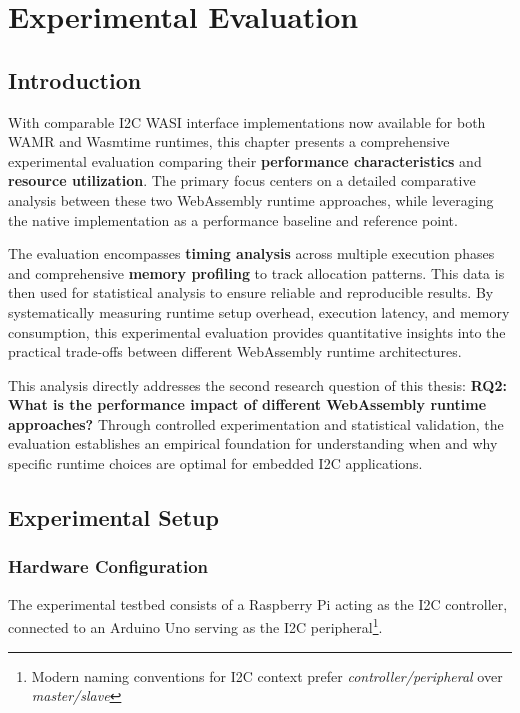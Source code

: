 \chapter{Experimental Evaluation}
\label{chap:experimental-evaluation}

\section{Introduction}
\label{sec:eval-intro}


With comparable I2C WASI interface implementations now available for both WAMR and Wasmtime runtimes, this chapter presents a comprehensive experimental evaluation comparing their \textbf{performance characteristics} and \textbf{resource utilization}. The primary focus centers on a detailed comparative analysis between these two WebAssembly runtime approaches, while leveraging the native implementation as a performance baseline and reference point.

The evaluation encompasses \textbf{timing analysis} across multiple execution phases and comprehensive \textbf{memory profiling} to track allocation patterns. This data is then used for statistical analysis to ensure reliable and reproducible results. By systematically measuring runtime setup overhead, execution latency, and memory consumption, this experimental evaluation provides quantitative insights into the practical trade-offs between different WebAssembly runtime architectures.

This analysis directly addresses the second research question of this thesis: \textbf{RQ2: What is the performance impact of different WebAssembly runtime approaches?} Through controlled experimentation and statistical validation, the evaluation establishes an empirical foundation for understanding when and why specific runtime choices are optimal for embedded I2C applications.

\section{Experimental Setup}
\label{sec:experimental-setup}

\subsection{Hardware Configuration}
\label{subsec:hardware-config}

The experimental testbed consists of a Raspberry Pi acting as the I2C controller, connected to an Arduino Uno serving as the I2C peripheral\footnote{Modern naming conventions for I2C context prefer \textit{controller/peripheral} over \textit{master/slave}}.

